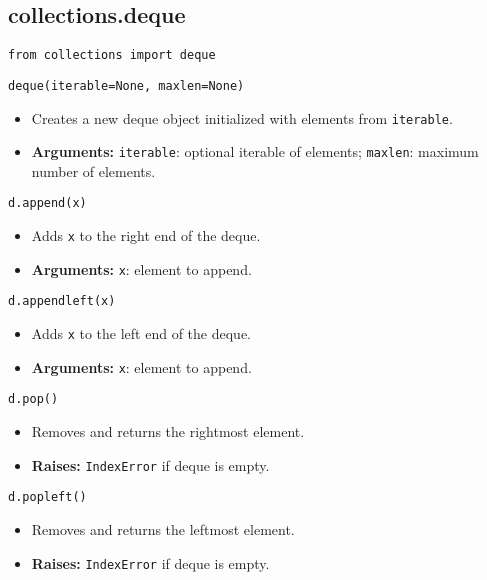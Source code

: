\subsection{collections.deque}
\begin{summary}
\begin{lstlisting}
from collections import deque
\end{lstlisting}

\begin{lstlisting}
deque(iterable=None, maxlen=None)
\end{lstlisting}
\begin{itemize}
    \item Creates a new deque object initialized with elements from \texttt{iterable}.
    \item \textbf{Arguments:} \texttt{iterable}: optional iterable of elements; \texttt{maxlen}: maximum number of elements.
\end{itemize}

\begin{lstlisting}
d.append(x)
\end{lstlisting}
\begin{itemize}
    \item Adds \texttt{x} to the right end of the deque.
    \item \textbf{Arguments:} \texttt{x}: element to append.
\end{itemize}

\begin{lstlisting}
d.appendleft(x)
\end{lstlisting}
\begin{itemize}
    \item Adds \texttt{x} to the left end of the deque.
    \item \textbf{Arguments:} \texttt{x}: element to append.
\end{itemize}

\begin{lstlisting}
d.pop()
\end{lstlisting}
\begin{itemize}
    \item Removes and returns the rightmost element.
    \item \textbf{Raises:} \texttt{IndexError} if deque is empty.
\end{itemize}

\begin{lstlisting}
d.popleft()
\end{lstlisting}
\begin{itemize}
    \item Removes and returns the leftmost element.
    \item \textbf{Raises:} \texttt{IndexError} if deque is empty.
\end{itemize}


\end{summary}
